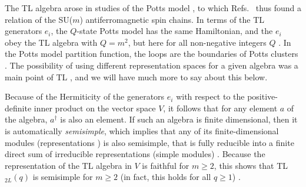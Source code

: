 \documentclass[twocolumn,floats,pra]{revtex4}
\begin{document}
The TL algebra arose in studies of the Potts model
\cite{tl,baxter}, to which Refs.\ \cite{bb,affleck3} thus found a
relation of the SU($m$) antiferromagnetic spin chains. In terms of
the TL generators $e_i$, the $Q$-state Potts model has the same
Hamiltonian, and the $e_i$ obey the TL algebra with $Q=m^2$, but
here for all non-negative integers $Q$ \cite{baxter}. In the Potts
model partition function, the loops are the boundaries of Potts
clusters \cite{baxter}. The possibility of using different
representation spaces for a given algebra was a main point of TL
\cite{tl}, and we will have much more to say about this below.

Because of the Hermiticity of the generators $e_i$ with respect to
the positive-definite inner product on the vector space $V$, it
follows that for any element $a$ of the algebra, $a^\dagger$ is
also an element. If such an algebra is finite dimensional, then it
is automatically {\em semisimple}, which implies that any of its
finite-dimensional modules (representations \cite{reps}) is also
semisimple, that is fully reducible into a finite direct sum of
irreducible representations (simple modules) \cite{pierce,anf}.
Because the representation of the TL algebra in $V$ is faithful
for $m\geq 2$, this shows that TL$_{2L}(q)$ is semisimple for
$m\geq2$ (in fact, this holds for all $q\geq 1$)
\cite{jones1,ghj,martin}.
\end{document}
